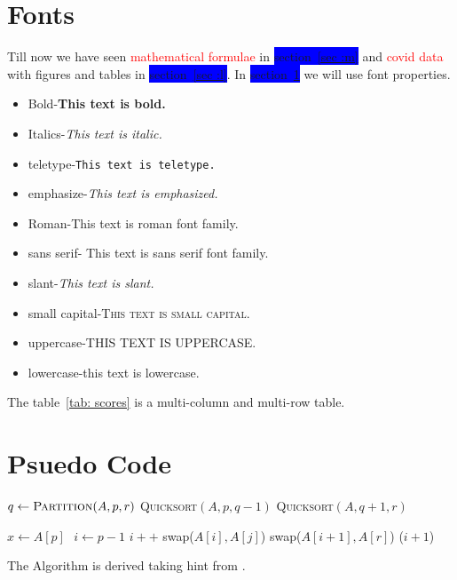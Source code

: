 \documentclass{article}
\begin{document}
{\section{Fonts} 
\label{sec: f}%
Till now we have seen \textcolor{red}{mathematical formulae} in \colorbox{blue}{section~\ref{sec :m}} and \textcolor{red}{covid data} with figures and tables in \colorbox{blue}{section~\ref{sec :l}}. In \colorbox{blue}{section~\ref{sec: f}} we will use font properties.%
\begin{itemize}
\item Bold-\textbf{This text is bold.} %
\item Italics-\textit{This text is italic.}%
\item teletype-\texttt{This text is teletype.}%
\item emphasize-\emph{This text is emphasized.}%
\item Roman-\rm{This text is roman font family.}%
\item sans serif-\textsf{ This text is sans serif font family.}%
\item slant-\textsl{This text is slant.}%
\item small capital-\textsc{This text is small capital.}%
\item uppercase-\uppercase{This text is uppercase.}%
\item lowercase-\lowercase{This text is lowercase.}%
\end{itemize}
\par {The table~\ref{tab: scores} is a multi-column and multi-row table.}
}
{\newpage
\pagecolor{white}
\section{Psuedo Code}
 \begin{algorithmic}
\State $q \gets \textsc{Partition}(A,p,r)$
\State \textsc{Quicksort}$(A,p,q-1)$
\State \textsc{Quicksort}$(A,q+1,r)$
\EndIf
\EndFunction

 $x \gets A[p] \texttt{ } i \gets p - 1$ 
\State $i++$
\State swap($A[i],A[j]$) 
\EndIf
      \EndFor
\State    swap($A[i+1],A[r]$)  
\State \Return ($i+1$) 
\EndFunction
\end{algorithmic}
The Algorithm is derived taking hint from \cite{hoare1962quicksort}.%
}

\newpage



\end{document}
